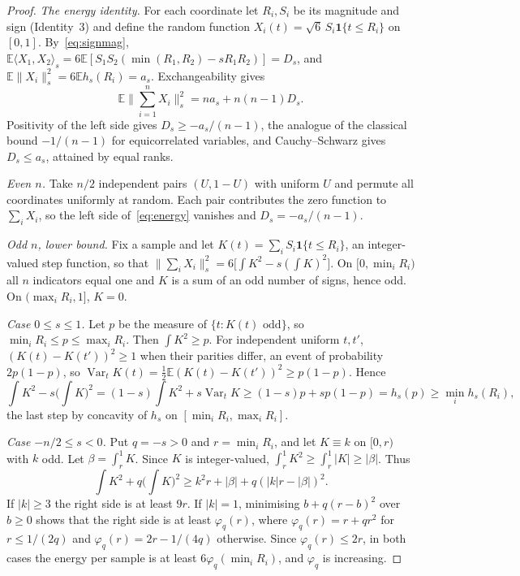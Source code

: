 \documentclass[11pt,a4paper]{article}
\theoremstyle{remark}
\newcommand{\EE}{\mathbb{E}}
\newcommand{\ind}{\mathbf 1}
\DeclareMathOperator{\Var}{Var}
\begin{document}
\begin{proof}
\emph{The energy identity.} For each coordinate let $R_i,S_i$ be its magnitude and sign (Identity~3) and define the random function $X_i(t)=\sqrt6\,S_i\ind\{t\leq R_i\}$ on $[0,1]$. By~\eqref{eq:signmag}, $\EE\langle X_1,X_2\rangle_s=6\EE[S_1S_2(\min(R_1,R_2)-sR_1R_2)]=D_s$, and $\EE\|X_i\|_s^2=6\EE h_s(R_i)=a_s$. Exchangeability gives
\begin{equation}
 \EE\Big\|\sum_{i=1}^nX_i\Big\|_s^2=na_s+n(n-1)D_s .\label{eq:energy}
\end{equation}
Positivity of the left side gives $D_s\geq-a_s/(n-1)$, the analogue of the classical bound $-1/(n-1)$ for equicorrelated variables, and Cauchy--Schwarz gives $D_s\leq a_s$, attained by equal ranks.

\emph{Even $n$.} Take $n/2$ independent pairs $(U,1-U)$ with uniform $U$ and permute all coordinates uniformly at random. Each pair contributes the zero function to $\sum_iX_i$, so the left side of~\eqref{eq:energy} vanishes and $D_s=-a_s/(n-1)$.

\emph{Odd $n$, lower bound.} Fix a sample and let $K(t)=\sum_iS_i\ind\{t\leq R_i\}$, an integer-valued step function, so that $\|\sum_iX_i\|_s^2=6\big[\int K^2-s(\int K)^2\big]$. On $[0,\min_iR_i)$ all $n$ indicators equal one and $K$ is a sum of an odd number of signs, hence odd. On $(\max_iR_i,1]$, $K=0$.

\emph{Case $0\leq s\leq1$.} Let $p$ be the measure of $\{t:K(t)\text{ odd}\}$, so $\min_iR_i\leq p\leq\max_iR_i$. Then $\int K^2\geq p$. For independent uniform $t,t'$, $(K(t)-K(t'))^2\geq1$ when their parities differ, an event of probability $2p(1-p)$, so $\Var_tK(t)=\frac12\EE(K(t)-K(t'))^2\geq p(1-p)$. Hence
\[
 \int K^2-s\Big(\int K\Big)^2=(1-s)\int K^2+s\Var_tK\geq(1-s)p+sp(1-p)=h_s(p)\geq\min_ih_s(R_i),
\]
the last step by concavity of $h_s$ on $[\min_iR_i,\max_iR_i]$.

\emph{Case $-n/2\leq s<0$.} Put $q=-s>0$ and $r=\min_iR_i$, and let $K\equiv k$ on $[0,r)$ with $k$ odd. Let $\beta=\int_r^1K$. Since $K$ is integer-valued, $\int_r^1K^2\geq\int_r^1|K|\geq|\beta|$. Thus
\[
 \int K^2+q\Big(\int K\Big)^2\geq k^2r+|\beta|+q(|k|r-|\beta|)^2 .
\]
If $|k|\geq3$ the right side is at least $9r$. If $|k|=1$, minimising $b+q(r-b)^2$ over $b\geq0$ shows that the right side is at least $\varphi_q(r)$, where $\varphi_q(r)=r+qr^2$ for $r\leq1/(2q)$ and $\varphi_q(r)=2r-1/(4q)$ otherwise. Since $\varphi_q(r)\leq2r$, in both cases the energy per sample is at least $6\varphi_q(\min_iR_i)$, and $\varphi_q$ is increasing.


\end{proof}
\end{document}
